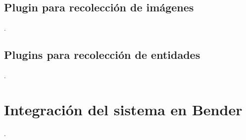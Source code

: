 \subsection{Plugin para recolección de imágenes}
.

\subsection{Plugins para recolección de entidades}
.


\section{Integración del sistema en Bender}

.



